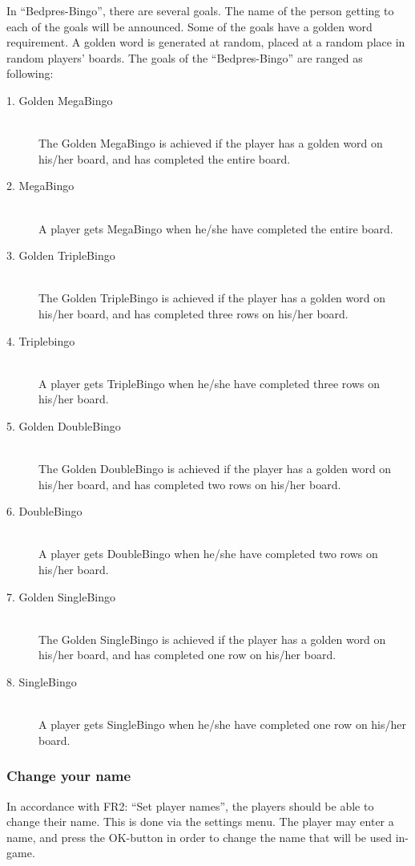 In ``Bedpres-Bingo'', there are several goals. The name of the person
getting to each of the goals will be announced. Some of the goals have
a golden word requirement. A golden word is generated at random, placed
at a random place in random players' boards.
The goals of the ``Bedpres-Bingo'' are ranged as following:
\begin{description}
	\item[1. Golden MegaBingo]\hfill \\
		{The Golden MegaBingo is achieved if the player has a golden
		word on his/her board, and has completed the entire board.}
	\item[2. MegaBingo]\hfill \\
		{A player gets MegaBingo when he/she have completed the entire
		board.}
	\item[3. Golden TripleBingo]\hfill \\
		{The Golden TripleBingo is achieved if the player has a golden
		word on his/her board, and has completed three rows on his/her
		board.}
	\item[4. Triplebingo]\hfill \\
		{A player gets TripleBingo when he/she have completed three
		rows on his/her board.}
	\item[5. Golden DoubleBingo]\hfill \\
		{The Golden DoubleBingo is achieved if the player has a golden
		word on his/her board, and has completed two rows on his/her
		board.}
	\item[6. DoubleBingo]\hfill \\
		{A player gets DoubleBingo when he/she have completed two
		rows on his/her board.}
	\item[7. Golden SingleBingo]\hfill \\
		{The Golden SingleBingo is achieved if the player has a golden
		word on his/her board, and has completed one row on his/her
		board.}
	\item[8. SingleBingo]\hfill \\
		{A player gets SingleBingo when he/she have completed one
		row on his/her board.}
\end{description}


\subsubsection{Change your name}
In accordance with FR2: ``Set player names'', the players should be able to
change their name. This is done via the settings menu. The player may enter a
name, and press the OK-button in order to change the name that will be used
in-game.

